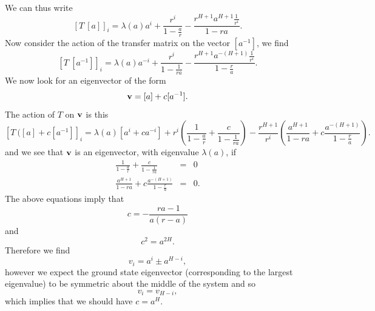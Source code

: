 We  can thus write
\begin{equation}
    \left[T\ [a]\right]_i= \lambda(a)a^i +\frac{r^i}{1-\frac{a}{r}}-\frac{r^{H+1}a^{H+1}\frac{1}{r^i}}{1-ra}.
\end{equation}
Now consider the action of the transfer matrix on the vector $[a^{-1}]$, we find
\begin{equation}
    \left[T\ [a^{-1}]\right]_i = \lambda(a) a^{-i} + \frac{r^i}{1-\frac{1}{ra}}-\frac{r^{H+1}a^{-(H+1)}\frac{1}{r^i}}{1-\frac{r}{a}}.
\end{equation}
We now look for an eigenvector of the form
\begin{equation}
    {\bf v} = [a]+ c[a^{-1}].
\end{equation}
The action of $T$ on ${\bf v}$ is this
\begin{equation}
    \left[T\ ([a]+c [a^{-1}]\right]_i = \lambda(a)[a^i + c a^{-i}]
+ r^i\left(\frac{1}{1-\frac{a}{r}}+ \frac{c}{1-\frac{1}{ra}}\right)
- \frac{r^{H+1}}{r^i}\left(\frac{a^{H+1}}{1-ra} + c\frac{a^{-(H+1)}}{1-\frac{r}{a}}\right).
\end{equation}
and we see that ${\bf v}$ is an eigenvector, with eigenvalue $\lambda(a)$,  if
\begin{eqnarray}
\frac{1}{1-\frac{a}{r}}+ \frac{c}{1-\frac{1}{ra}}&=&0 \\
\frac{a^{H+1}}{1-ra} + c\frac{a^{-(H+1)}}{1-\frac{r}{a}} &=&0.
\end{eqnarray}
The above equations imply that 
\begin{equation}
    c= -\frac{ra-1}{a(r-a)}
\end{equation}
and
\begin{equation}
    c^2 = a^{2H}.
\end{equation}
Therefore we find
\begin{equation}
    v_i = a^i \pm a^{H-i},
\end{equation}
however we expect the ground state eigenvector (corresponding to the largest eigenvalue)  to be symmetric about the middle of the system and so 
\begin{equation}
    v_i= v_{H-i},
\end{equation}
which implies that we should have $c= a^H$. 

